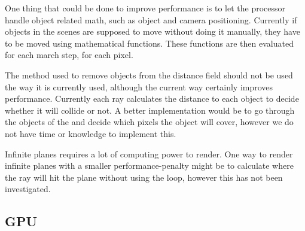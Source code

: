 			One thing that could be done to improve performance is to let the
			processor handle object related math, such as object and camera 
			positioning. Currently if objects in the scenes are supposed to 
			move without doing it manually, they have to be moved using 
			mathematical functions. These functions are then evaluated for 
			each march step, for each pixel.

			The method used to remove objects from the distance field should
			not be used the way it is currently used, although the current way
			certainly improves performance. Currently each ray calculates the
			distance to each object to decide whether it will collide or not. 
			A better implementation would be to go through the objects of the 
			and decide which pixels the object will cover, however we do not
			have time or knowledge to implement this. 

			Infinite planes requires a lot of computing power to render. One 
			way to render infinite planes with a smaller performance-penalty 
			might be to calculate where the ray will hit the plane without 
			using the loop, however this has not been investigated. 


		
		\subsection{GPU} 
